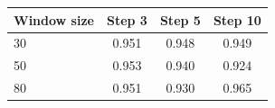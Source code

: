 \begin{tabular}{lccc}
\toprule
Window size & Step 3 & Step 5 & Step 10 \\
\midrule
30 & 0.951 & 0.948 & 0.949 \\
50 & 0.953 & 0.940 & 0.924 \\
80 & 0.951 & 0.930 & 0.965 \\
\bottomrule
\end{tabular}
